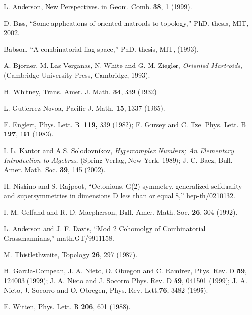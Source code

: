 \documentclass[a4paper,12pt]{article}
\begin{document}
\begin{thebibliography}{99}
  L. Anderson, New Perspectives. in Geom. Comb. \textbf{38}, 1
(1999).

  D. Biss, ``Some applications of oriented matroids to
topology,'' PhD. thesis, MIT, 2002.

  Babson, ``A combinatorial flag space,'' PhD. thesis, MIT,
(1993).

  A. Bjorner, M. Las Verganas, N. White and G. M. Ziegler, 
\textit{Oriented Martroids}, (Cambridge University Press, Cambridge, 1993).

  H. Whitney, Trans. Amer. J. Math. \textbf{34}, 339 (1932)

  L. Gutierrez-Novoa, Pacific J. Math. \textbf{15}, 1337 (1965).

  F. Englert, Phys. Lett. B\textbf{\ 119,} 339 (1982); F. Gursey
and C. Tze, Phys. Lett. B \textbf{127}, 191 (1983).

  I. L. Kantor and A.S. Solodovnikov, \textit{Hypercomplex
Numbers; An Elementary Introduction to Algebras,} (Spring Verlag, New York,
1989); J. C. Baez, Bull. Amer. Math. Soc. \textbf{39}, 145 (2002).

  H. Nishino and S. Rajpoot, ``Octonions, G(2) symmetry,
generalized selfduality and supersymmetries in dimensions D less than or
equal 8,'' hep-th/0210132.

  I. M. Gelfand and R. D. Macpherson, Bull. Amer. Math. Soc. 
\textbf{26}, 304 (1992).

  L. Anderson and J. F. Davis, ``Mod 2 Cohomolgy of
Combinatorial Grassmannians,'' math.GT/9911158.

  M. Thistlethwaite, Topology \textbf{26}, 297 (1987).

  H. Garcia-Compean, J. A. Nieto, O. Obregon and C. Ramirez,
Phys. Rev. D \textbf{59}, 124003 (1999); J. A. Nieto and J. Socorro Phys.
Rev. D \textbf{59}, 041501 (1999); J. A. Nieto, J. Socorro and O. Obregon,
Phys. Rev. Lett.\textbf{76}, 3482 (1996).

  E. Witten, Phys. Lett. B \textbf{206}, 601 (1988).
\end{thebibliography}
\end{document}

